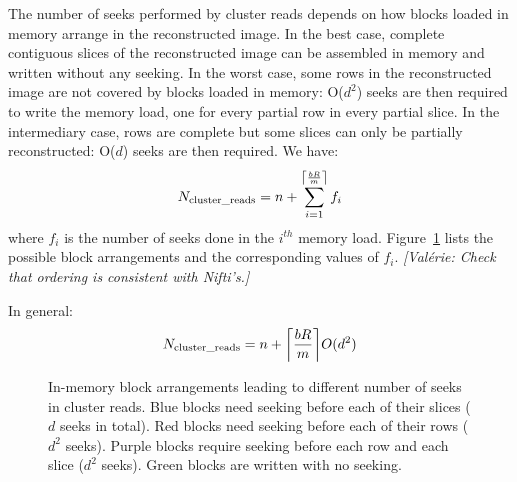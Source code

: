 \documentclass[10pt, conference, compsocconf]{IEEEtran}
\DeclarePairedDelimiter{\ceil}{\lceil}{\rceil}
\newcommand{\todo}[1]{
  \color{red}\emph{[#1]}
  \color{black}
}
\begin{document}
The number of seeks performed by cluster reads depends on how blocks
loaded in memory arrange in the reconstructed image. In the best case,
complete contiguous slices of the reconstructed image can be assembled
in memory and written without any seeking. In the worst case, some
rows in the reconstructed image are not covered by blocks loaded in
memory: O($d^2$) seeks are then required to write the memory load, one
for every partial row in every partial slice. In the intermediary
case, rows are complete but some slices can only be partially
reconstructed: O($d$) seeks are then
required. We have:
\begin{equation}
  N_\mathrm{cluster\_reads}= n + \sum_{i=1}^{\ceil*{\frac{bR}{m}}}f_i
\end{equation}
where $f_i$ is the number of seeks done in the $i^{th}$ memory
load. Figure~\ref{fig:cluster-reads} lists the possible block
arrangements and the corresponding values of $f_i$. \todo{Val\'erie: Check that
  ordering is consistent with Nifti's.}
In general:
\begin{equation}
  N_\mathrm{cluster\_reads}= n + \ceil*{\frac{bR}{m}}O(d^2)
\end{equation}

\begin{figure}
\centering
\def\svgwidth{0.3\columnwidth}

\def\svgwidth{0.3\columnwidth}

\def\svgwidth{0.3\columnwidth}

\def\svgwidth{0.3\columnwidth}

\def\svgwidth{0.3\columnwidth}

\def\svgwidth{0.3\columnwidth}

\def\svgwidth{0.3\columnwidth}

\def\svgwidth{0.3\columnwidth}

\def\svgwidth{0.3\columnwidth}


\caption{In-memory block arrangements leading to different number of
  seeks in cluster reads. Blue blocks need seeking before each of
  their slices ($d$ seeks in total). Red blocks need seeking before
  each of their rows ($d^2$ seeks). Purple blocks require seeking
  before each row and each slice ($d^2$ seeks). Green blocks are
  written with no seeking.}
\label{fig:cluster-reads}
\end{figure}
\end{document}
